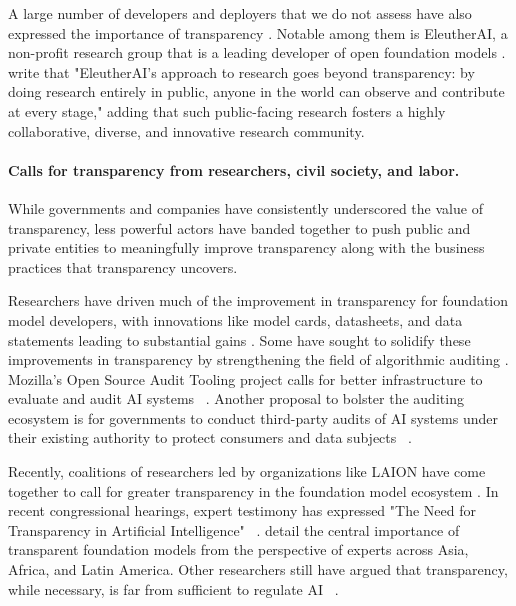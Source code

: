 \documentclass[screen, authorversion, acmsmall]{acmart}
\begin{document}
A large number of developers and deployers that we do not assess have also expressed the importance of transparency \citep{jobin2019global,fjeld2020principled,wef2023presidio}. Notable among them is EleutherAI, a non-profit research group that is a leading developer of open foundation models \citep{skowron2023euaiact}. 
\citet{phang2022eleutherai} write that "EleutherAI’s approach to research goes beyond transparency: by doing research entirely in public, anyone in the world can observe and contribute at every stage," adding that such public-facing research fosters a highly collaborative, diverse, and innovative research community. 

\paragraph{\textbf{Calls for transparency from researchers, civil society, and labor.}}

While governments and companies have consistently underscored the value of transparency, less powerful actors have banded together to push public and private entities to meaningfully improve transparency along with the business practices that transparency uncovers. 

Researchers have driven much of the improvement in transparency for foundation model developers, with innovations like model cards, datasheets, and data statements leading to substantial gains \citep{mitchell2018modelcards,gebru2018datasheets,bender-friedman-2018-data}.
Some have sought to solidify these improvements in transparency by strengthening the field of algorithmic auditing \citep{costanzachock2022audit}. 
Mozilla's Open Source Audit Tooling project calls for better infrastructure to evaluate and audit AI systems ~\citep{raji2022mozilla}.
Another proposal to bolster the auditing ecosystem is for governments to conduct third-party audits of AI systems under their existing authority to protect consumers and data subjects ~\citep{miller2021radical}.

Recently, coalitions of researchers led by organizations like LAION have come together to call for greater transparency in the foundation model ecosystem \citep{laion2023transparentai}.
In recent congressional hearings, expert testimony has expressed "The Need for Transparency in Artificial Intelligence" ~\citep{gregory2023testimony}.
\citet{belli2023igf} detail the central importance of transparent foundation models from the perspective of experts across Asia, Africa, and Latin America. 
Other researchers still have argued that transparency, while necessary, is far from sufficient to regulate AI ~\citep{hartzog2023oversight}.
\end{document}
